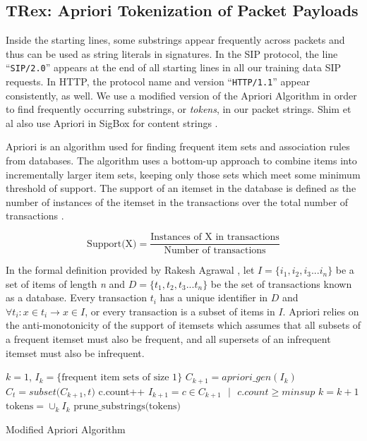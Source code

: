 \subsection{TRex: Apriori Tokenization of Packet Payloads}
Inside the starting lines, some substrings appear frequently across packets and thus can be used as string literals in signatures. In the SIP protocol, the line ``\texttt{SIP/2.0}'' appears at the end of all starting lines in all our training data SIP requests. In HTTP, the protocol name and version ``\texttt{HTTP/1.1}'' appear consistently, as well. We use a modified version of the Apriori Algorithm \cite{Toivonen2017} in order to find frequently occurring substrings, or \textit{tokens}, in our packet strings. Shim et al also use Apriori in SigBox for content strings \cite{sigbox}.

Apriori is an algorithm used for finding frequent item sets and association rules from databases. The algorithm uses a bottom-up approach to combine items into incrementally larger item sets, keeping only those sets which meet some minimum threshold of support. The support of an itemset in the database is defined as the number of instances of the itemset in the transactions over the total number of transactions \cite{Toivonen2017}.

\vspace{\baselineskip}

\[\text{Support(X)} = \frac{\text{Instances of X in transactions}}{\text{Number of transactions}}\] \par

\vspace{\baselineskip}

In the formal definition provided by Rakesh Agrawal \cite{Agrawal}, let $I = \{i_{1},i_{2},i_{3}...i_{n}\}$ be a set of items of length \textit{n} and $D = \{t_{1},t_{2},t_{3}...t_{n}\}$ be the set of transactions known as a database. Every transaction $t_{i}$ has a unique identifier in $D$ and $\forall t_{i} : x \in t_{i} \rightarrow x \in I$, or every transaction is a subset of items in $I$. Apriori relies on the anti-monotonicity of the support of itemsets which assumes that all subsets of a frequent itemset must also be frequent, and all supersets of an infrequent itemset must also be infrequent. \par

\begin{algorithm}
\SetAlgoLined
{}
 $k=1$, $I_{k} = \{\text{frequent item sets of size 1}\}$\;
  {
 $C_{k+1} = apriori\_gen(I_{k})$\;
  {
      $C_{t} = subset\text{(}C_{k+1}, t\text{)}$\;
       {
      c.count++\;
      }
      $I_{k+1} = c \in C_{k+1} \text{ }\vert \text{ } c.count \geq minsup$\;
   }
   $k = k + 1$\;
  }
  $\text{tokens} = \cup_{k}I_{k}$\;
  \Return $\text{prune\_substrings(tokens)}$\;
 \caption{Modified Apriori Algorithm \cite{Agrawal}}
\end{algorithm}

